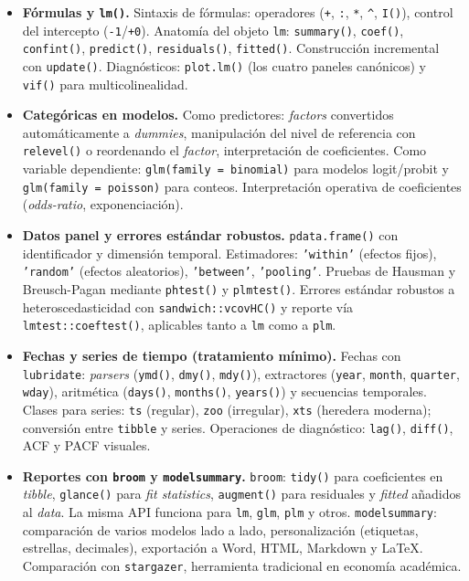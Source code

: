 \documentclass[11pt,letterpaper]{article}
\begin{document}
\begin{itemize}[leftmargin=*, itemsep=2pt]
    \item \textbf{Fórmulas y \texttt{lm()}.} Sintaxis de fórmulas: operadores (\texttt{+}, \texttt{:}, \texttt{*}, \texttt{\textasciicircum}, \texttt{I()}), control del intercepto (\texttt{-1}/\texttt{+0}). Anatomía del objeto \texttt{lm}: \texttt{summary()}, \texttt{coef()}, \texttt{confint()}, \texttt{predict()}, \texttt{residuals()}, \texttt{fitted()}. Construcción incremental con \texttt{update()}. Diagnósticos: \texttt{plot.lm()} (los cuatro paneles canónicos) y \texttt{vif()} para multicolinealidad.
    \item \textbf{Categóricas en modelos.} Como predictores: \textit{factors} convertidos automáticamente a \textit{dummies}, manipulación del nivel de referencia con \texttt{relevel()} o reordenando el \textit{factor}, interpretación de coeficientes. Como variable dependiente: \texttt{glm(family = binomial)} para modelos logit/probit y \texttt{glm(family = poisson)} para conteos. Interpretación operativa de coeficientes (\textit{odds-ratio}, exponenciación).
    \item \textbf{Datos panel y errores estándar robustos.} \texttt{pdata.frame()} con identificador y dimensión temporal. Estimadores: \texttt{'within'} (efectos fijos), \texttt{'random'} (efectos aleatorios), \texttt{'between'}, \texttt{'pooling'}. Pruebas de Hausman y Breusch-Pagan mediante \texttt{phtest()} y \texttt{plmtest()}. Errores estándar robustos a heteroscedasticidad con \texttt{sandwich::vcovHC()} y reporte vía \texttt{lmtest::coeftest()}, aplicables tanto a \texttt{lm} como a \texttt{plm}.
    \item \textbf{Fechas y series de tiempo (tratamiento mínimo).} Fechas con \texttt{lubridate}: \textit{parsers} (\texttt{ymd()}, \texttt{dmy()}, \texttt{mdy()}), extractores (\texttt{year}, \texttt{month}, \texttt{quarter}, \texttt{wday}), aritmética (\texttt{days()}, \texttt{months()}, \texttt{years()}) y secuencias temporales. Clases para series: \texttt{ts} (regular), \texttt{zoo} (irregular), \texttt{xts} (heredera moderna); conversión entre \texttt{tibble} y series. Operaciones de diagnóstico: \texttt{lag()}, \texttt{diff()}, ACF y PACF visuales.
    \item \textbf{Reportes con \texttt{broom} y \texttt{modelsummary}.} \texttt{broom}: \texttt{tidy()} para coeficientes en \textit{tibble}, \texttt{glance()} para \textit{fit statistics}, \texttt{augment()} para residuales y \textit{fitted} añadidos al \textit{data}. La misma API funciona para \texttt{lm}, \texttt{glm}, \texttt{plm} y otros. \texttt{modelsummary}: comparación de varios modelos lado a lado, personalización (etiquetas, estrellas, decimales), exportación a Word, HTML, Markdown y LaTeX. Comparación con \texttt{stargazer}, herramienta tradicional en economía académica.
\end{itemize}
\end{document}
